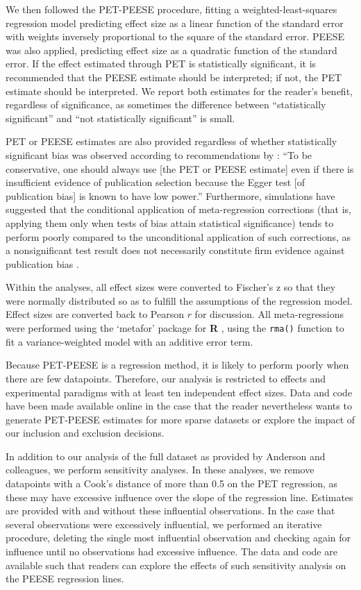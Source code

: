 \documentclass[man]{apa6}
\begin{document}
We then followed the PET-PEESE procedure, fitting a weighted-least-squares regression model predicting effect size as a linear function of the standard error with weights inversely proportional to the square of the standard error.
PEESE was also applied, predicting effect size as a quadratic function of the standard error. If the effect estimated through PET is statistically significant, it is recommended that the PEESE estimate should be interpreted; if not, the PET estimate should be interpreted. We report both estimates for the reader's benefit, regardless of significance, as sometimes the difference between ``statistically significant'' and ``not statistically significant'' is small. 

PET or PEESE estimates are also provided regardless of whether statistically significant bias was observed according to recommendations by \citet[p. 20-21]{Stanley:Doucouliagos:2013}: ``To be conservative, one should always use [the PET or PEESE estimate] even if there is insufficient evidence of publication selection because the Egger test [of publication bias] is known to have low power.'' Furthermore, simulations have suggested that the conditional application of meta-regression corrections (that is, applying them only when tests of bias attain statistical significance) tends to perform poorly compared to the unconditional application of such corrections, as a nonsignificant test result does not necessarily constitute firm evidence against publication bias \citep{Moreno:etal:2006}.

Within the analyses, all effect sizes were converted to Fischer's z so that they were normally distributed so as to fulfill the assumptions of the regression model. Effect sizes are converted back to Pearson $r$ for discussion. All meta-regressions were performed using the `metafor' package for {\bf R} \citep{Viechtbauer:2010}, using the {\tt rma()} function to fit a variance-weighted model with an additive error term.

Because PET-PEESE is a regression method, it is likely to perform poorly when there are few datapoints. Therefore, our analysis is restricted to effects and experimental paradigms with at least ten independent effect sizes. %
Data and code have been made available online in the case that the reader nevertheless wants to generate PET-PEESE estimates for more sparse datasets or explore the impact of our inclusion and exclusion decisions.

In addition to our analysis of the full dataset as provided by Anderson and colleagues, we perform sensitivity analyses. In these analyses, we remove datapoints with a Cook's distance of more than 0.5 on the PET regression, as these may have excessive influence over the slope of the regression line. Estimates are provided with and without these influential observations. In the case that several observations were excessively influential, we performed an iterative procedure, deleting the single most influential observation and checking again for influence until no observations had excessive influence. The data and code are available such that readers can explore the effects of such sensitivity analysis on the PEESE regression lines.
\end{document}
